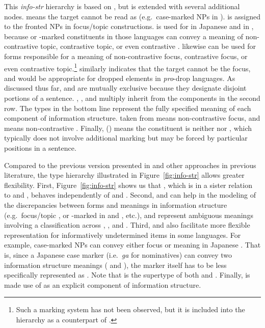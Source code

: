 This \textit{info-str} hierarchy is based on \citet{song:bender:11},
but is extended with several additional nodes. 
 means the target cannot be read as 
(e.g.\ case-marked NPs in ).   is
assigned to the fronted NPs in focus/topic  constructions.
 is used for \wa in Japanese and \nun in
, because \wa or \onun-marked constituents in those
languages can convey a meaning of non-contrastive topic, contrastive
topic, or even contrastive .   likewise
can be used for forms responsible for a meaning of non-contrastive
focus, contrastive focus, or even contrastive topic.\footnote{Such a
  marking system has not been observed, but it is included into the
  hierarchy as a counterpart of .}
 similarly indicates that the target cannot be the
focus, and would be appropriate for dropped elements in
\textit{pro}-drop languages. As discussed thus far,  and
 are mutually exclusive because they designate disjoint
portions of a sentence. , , and 
multiply inherit from the components in the second row.
The types in the bottom line represent the fully specified meaning of each
component of information structure.  taken from
\citet{gundel:99} means non-contrastive focus, and
 means non-contrastive . Finally, 
() means the constituent is neither  nor
, which typically does not involve additional marking but
may be forced by particular positions in a sentence.


Compared to the previous version presented in \citet{song:bender:11}
and other approaches in previous literature, the type hierarchy
illustrated in Figure~\ref{fig:info-str} allows greater
flexibility. First, Figure~\ref{fig:info-str} shows us that
, which is in a sister relation to  and
, behaves independently of  and
. Second,  and
 can help in the modeling of the discrepancies
between forms and meanings in information structure (e.g.\ focus/topic
, \wa or \onun-marked  in  and
, etc.), and represent ambiguous meanings involving a
classification across , , and .
Third,  and  also facilitate more
flexible representation for informatively undetermined items in some
languages. For example, case-marked NPs can convey either focus or
 meaning in Japanese \citep{heycock:94}. That is,
since a Japanese case marker (i.e.\ \textit{ga} for nominatives) can
convey two information structure meanings ( and ),
the marker itself has to be less specifically represented as
. Note that  is the supertype of both
 and . Finally,  is made use of as an
explicit component of information structure.


